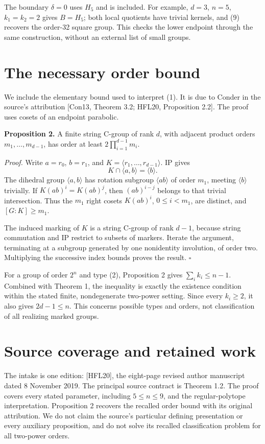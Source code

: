 The boundary \(\delta=0\) uses \(H_5\) and is included. For example,
\(d=3\), \(n=5\), \(k_1=k_2=2\) gives \(B=H_5\); both local quotients
have trivial kernels, and (9) recovers the order-32 square group. This
checks the lower endpoint through the same construction, without an
external list of small groups.

\section{The necessary order bound}\label{the-necessary-order-bound}
We include the elementary bound used to interpret (1). It is due to
Conder in the source's attribution {[}Con13, Theorem 3.2; HFL20,
Proposition 2.2{]}. The proof uses cosets of an endpoint parabolic.

\textbf{Proposition 2.} A finite string C-group of rank \(d\), with
adjacent product orders \(m_1,\ldots,m_{d-1}\), has order at least
\(2\prod_{i=1}^{d-1}m_i\).

\emph{Proof.} Write \(a=r_0\), \(b=r_1\), and
\(K=\langle r_1,\ldots,r_{d-1}\rangle\). IP gives \[
K\cap\langle a,b\rangle=\langle b\rangle.
\] The dihedral group \(\langle a,b\rangle\) has rotation subgroup
\(\langle ab\rangle\) of order \(m_1\), meeting \(\langle b\rangle\)
trivially. If \(K(ab)^i=K(ab)^j\), then \((ab)^{i-j}\) belongs to that
trivial intersection. Thus the \(m_1\) right cosets \(K(ab)^i\),
\(0\le i<m_1\), are distinct, and \([G:K]\ge m_1\).

The induced marking of \(K\) is a string C-group of rank \(d-1\),
because string commutation and IP restrict to subsets of markers.
Iterate the argument, terminating at a subgroup generated by one
nonidentity involution, of order two. Multiplying the successive index
bounds proves the result. \(\square\)

For a group of order \(2^n\) and type (2), Proposition 2 gives
\(\sum_i k_i\le n-1\). Combined with Theorem 1, the inequality is
exactly the existence condition within the stated finite, nondegenerate
two-power setting. Since every \(k_i\ge2\), it also gives \(2d-1\le n\).
This concerns possible types and orders, not classification of all
realizing marked groups.

\section{Source coverage and retained work}\label{source-coverage-and-retained-work}
The intake is one edition: {[}HFL20{]}, the eight-page revised author
manuscript dated 8 November 2019. The principal source contract is
Theorem 1.2. The proof covers every stated parameter, including
\(5\le n\le9\), and the regular-polytope interpretation. Proposition 2
recovers the recalled order bound with its original attribution. We do
not claim the source's particular defining presentation or every
auxiliary proposition, and do not solve its recalled classification
problem for all two-power orders.

